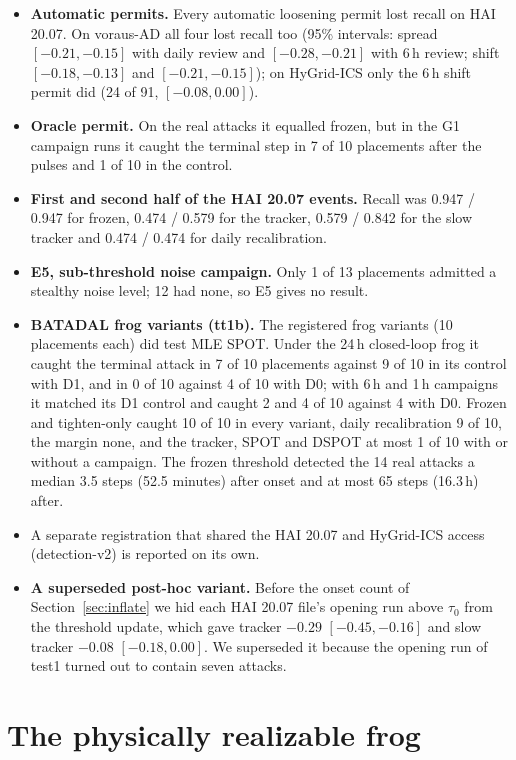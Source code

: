 \documentclass[sigconf]{acmart}
\begin{document}
\begin{itemize}
\item \textbf{Automatic permits.} Every automatic loosening permit lost recall on HAI 20.07. On
  voraus-AD all four lost recall too (95\% intervals: spread $[-0.21, -0.15]$ with daily review and
  $[-0.28, -0.21]$ with 6\,h review; shift $[-0.18, -0.13]$ and $[-0.21, -0.15]$); on HyGrid-ICS only
  the 6\,h shift permit did (24 of 91, $[-0.08, 0.00]$).
\item \textbf{Oracle permit.} On the real attacks it equalled frozen, but in the G1 campaign runs it
  caught the terminal step in 7 of 10 placements after the pulses and 1 of 10 in the control.
\item \textbf{First and second half of the HAI 20.07 events.} Recall was 0.947 / 0.947 for frozen,
  0.474 / 0.579 for the tracker, 0.579 / 0.842 for the slow tracker and 0.474 / 0.474 for daily
  recalibration.
\item \textbf{E5, sub-threshold noise campaign.} Only 1 of 13 placements admitted a stealthy noise
  level; 12 had none, so E5 gives no result.
\item \textbf{BATADAL frog variants (tt1b).} The registered frog variants (10 placements each) did test MLE SPOT. Under the 24\,h closed-loop frog it caught the terminal attack in 7 of 10 placements against 9 of 10 in its control with D1, and in 0 of 10 against 4 of 10 with D0; with 6\,h and 1\,h campaigns it matched its D1 control and caught 2 and 4 of 10 against 4 with D0. Frozen and tighten-only caught 10 of 10 in every variant, daily recalibration 9 of 10, the margin none, and the tracker, SPOT and DSPOT at most 1 of 10 with or without a campaign. The frozen threshold detected the 14 real attacks a median 3.5 steps (52.5 minutes) after onset and at most 65 steps (16.3\,h) after.
\item A separate registration that shared the HAI 20.07 and HyGrid-ICS access (detection-v2) is reported
  on its own.
\item \textbf{A superseded post-hoc variant.} Before the onset count of Section~\ref{sec:inflate} we
  hid each HAI 20.07 file's opening run above $\tau_0$ from the threshold update, which gave tracker
  $-0.29$ $[-0.45, -0.16]$ and slow tracker $-0.08$ $[-0.18, 0.00]$. We superseded it because the
  opening run of test1 turned out to contain seven attacks.
\end{itemize}

\section{The physically realizable frog}
\label{app:physfrog}
\end{document}
